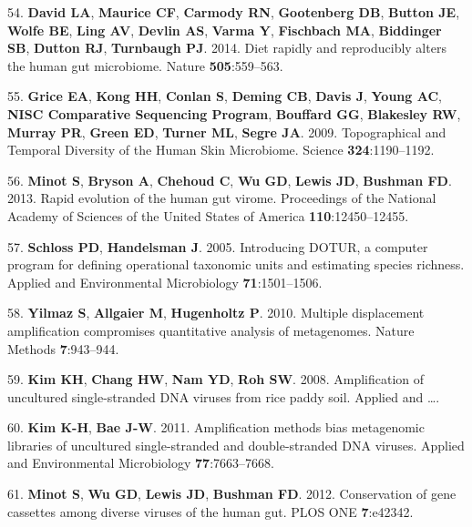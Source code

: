 \documentclass[12pt,]{article}
\begin{document}
\hypertarget{ref-David:2014cl}{}
54. \textbf{David LA}, \textbf{Maurice CF}, \textbf{Carmody RN},
\textbf{Gootenberg DB}, \textbf{Button JE}, \textbf{Wolfe BE},
\textbf{Ling AV}, \textbf{Devlin AS}, \textbf{Varma Y},
\textbf{Fischbach MA}, \textbf{Biddinger SB}, \textbf{Dutton RJ},
\textbf{Turnbaugh PJ}. 2014. Diet rapidly and reproducibly alters the
human gut microbiome. Nature \textbf{505}:559--563.

\hypertarget{ref-Grice:2009ee}{}
55. \textbf{Grice EA}, \textbf{Kong HH}, \textbf{Conlan S},
\textbf{Deming CB}, \textbf{Davis J}, \textbf{Young AC}, \textbf{NISC
Comparative Sequencing Program}, \textbf{Bouffard GG}, \textbf{Blakesley
RW}, \textbf{Murray PR}, \textbf{Green ED}, \textbf{Turner ML},
\textbf{Segre JA}. 2009. Topographical and Temporal Diversity of the
Human Skin Microbiome. Science \textbf{324}:1190--1192.

\hypertarget{ref-Minot:2013ih}{}
56. \textbf{Minot S}, \textbf{Bryson A}, \textbf{Chehoud C}, \textbf{Wu
GD}, \textbf{Lewis JD}, \textbf{Bushman FD}. 2013. Rapid evolution of
the human gut virome. Proceedings of the National Academy of Sciences of
the United States of America \textbf{110}:12450--12455.

\hypertarget{ref-Schloss:2005hz}{}
57. \textbf{Schloss PD}, \textbf{Handelsman J}. 2005. Introducing DOTUR,
a computer program for defining operational taxonomic units and
estimating species richness. Applied and Environmental Microbiology
\textbf{71}:1501--1506.

\hypertarget{ref-Yilmaz:2010jb}{}
58. \textbf{Yilmaz S}, \textbf{Allgaier M}, \textbf{Hugenholtz P}. 2010.
Multiple displacement amplification compromises quantitative analysis of
metagenomes. Nature Methods \textbf{7}:943--944.

\hypertarget{ref-Kim:2008to}{}
59. \textbf{Kim KH}, \textbf{Chang HW}, \textbf{Nam YD}, \textbf{Roh
SW}. 2008. Amplification of uncultured single-stranded DNA viruses from
rice paddy soil. Applied and \ldots{}.

\hypertarget{ref-Kim:2011hp}{}
60. \textbf{Kim K-H}, \textbf{Bae J-W}. 2011. Amplification methods bias
metagenomic libraries of uncultured single-stranded and double-stranded
DNA viruses. Applied and Environmental Microbiology
\textbf{77}:7663--7668.

\hypertarget{ref-Minot:2012ed}{}
61. \textbf{Minot S}, \textbf{Wu GD}, \textbf{Lewis JD}, \textbf{Bushman
FD}. 2012. Conservation of gene cassettes among diverse viruses of the
human gut. PLOS ONE \textbf{7}:e42342.
\end{document}
